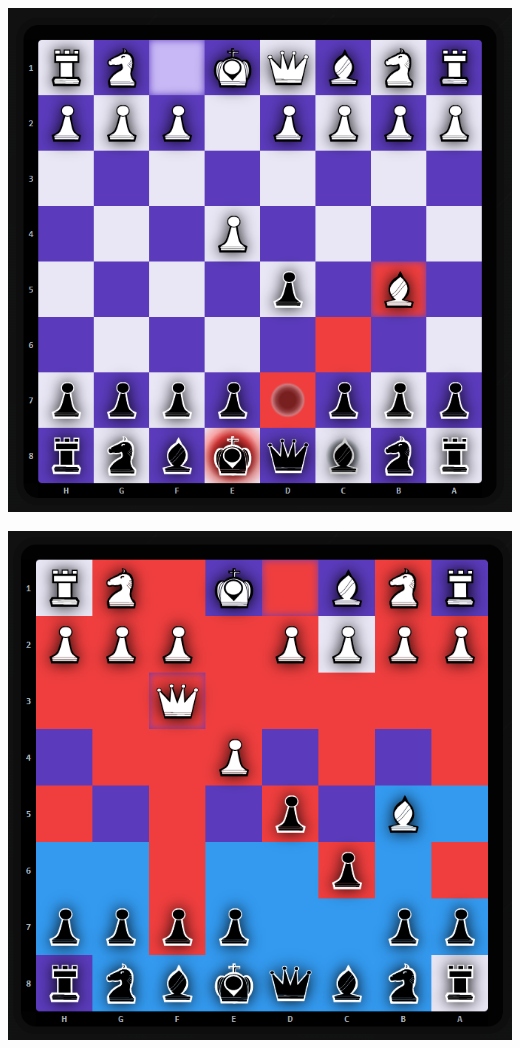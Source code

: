 \documentclass[twoside]{projektInzynierskiMS1}
\begin{document}
\vspace{1cm}
\noindent
\begin{minipage}[t]{0.45\textwidth} 
    \vspace{0pt} 
    \centering 
    \includegraphics[width=\linewidth]{images/imp_front_check_areas.png}   
\end{minipage} 
\hfill 
\begin{minipage}[t]{0.45\textwidth} 
    \vspace{0pt} 
    \centering 
    \includegraphics[width=\linewidth]{images/imp_front_controlled_areas.png} 
\end{minipage}
\end{document}
